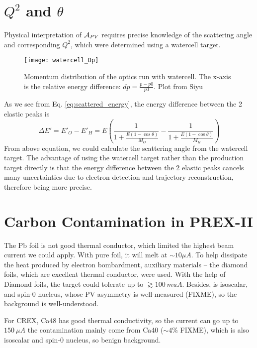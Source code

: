 \section{$Q^2$ and $\theta$}
Physical interpretation of $\mathcal{A}_{PV}$ requires precise knowledge
of the scattering angle and corresponding $Q^2$, which were determined using
a watercell target. 
\begin{figure}
    \centering
    \texttt{[image: watercell\_Dp]}
    \caption{Momentum distribution of the optics run with watercell. The x-axis
    is the relative energy difference: $dp = \frac{p - p0}{p0}$. Plot from Siyu}
\end{figure}
As we see from Eq. \ref{eq:scattered_energy}, the energy difference between the
2 elastic peaks is
\begin{equation}
    \Delta E' = E'_O - E'_H = E\left( \frac{1}{1 + \frac{E(1-\cos\theta)}{M_O}} -
    \frac{1}{1 + \frac{E(1-\cos\theta)}{M_H}} \right)
\end{equation}
From above equation, we could calculate the scattering angle from the watercell
target. The advantage of using the watercell target rather than the production
target directly is that the energy difference between the 2 elastic peaks cancels
many uncertainties due to electron detection and trajectory reconstruction, therefore
being more precise.

\section{Carbon Contamination in PREX-II}
The Pb foil is not good thermal conductor, which limited the highest beam current
we could apply. With pure \Pb foil, it will melt at $\sim 10 \mu A$. To help 
dissipate the heat produced by electron bombardment, auxiliary materials -- the 
diamond foils, which are excellent thermal conductor, were used. 
With the help of Diamond foils, the
\Pb target could tolerate up to $\gtrsim 100\ mu A$. Besides, \C is isoscalar, and spin-0 
nucleus, whose PV asymmetry is well-measured (FIXME), so the background is 
well-understood. 

For CREX, Ca48 has good thermal conductivity, so the current can go up to $150\ \mu A$
the contamination mainly come from Ca40 ($\sim 4\%$ FIXME), which is also isoscalar
and spin-0 nucleus, so benign background.

